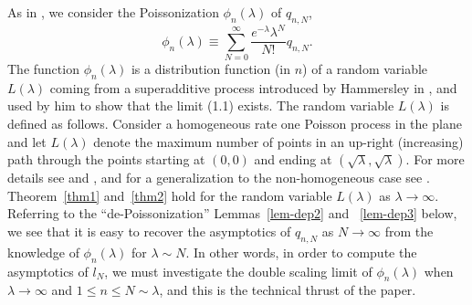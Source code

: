 \documentclass{amsart}
\theoremstyle{definition}
\theoremstyle{remark}
\numberwithin{equation}{section}
\begin{document}
\bigskip
As in \cite{Johan}, we consider the Poissonization $\phi_n(\lambda)$ 
of $q_{n,N}$, 
\begin{equation}\label{e-int4}
  \phi_n(\lambda) \equiv \sum_{N=0}^{\infty} 
\frac{e^{-\lambda}\lambda^N}{N!} q_{n,N}.
\end{equation}
The function $\phi_n(\lambda)$ is a distribution function (in $n$) of
a random variable $L(\lambda)$ coming from a superadditive process
introduced by Hammersley in \cite{Ha}, and used by him to show that the
limit (1.1) exists. The random variable $L(\lambda)$ is defined as
follows.
Consider a homogeneous rate one Poisson process in
the plane and let $L(\lambda)$ denote the maximum number of points in
an up-right (increasing) path through the points starting at $(0,0)$
and ending at $(\sqrt{\lambda},\sqrt{\lambda})$. For more details see
\cite{AD} and \cite{Se2}, and for a generalization to the non-homogeneous case
see \cite{DeZe}. Theorem~\ref{thm1}  and~\ref{thm2} 
hold for the random variable
$L(\lambda)$ as $\lambda\to\infty$.
Referring to the ``de-Poissonization'' 
Lemmas~\ref{lem-dep2} and ~\ref{lem-dep3} 
below, we see that it is easy to recover the asymptotics of $q_{n,N}$ 
as $N\to\infty$ from the knowledge of $\phi_n(\lambda)$ for 
$\lambda\sim N$. 
In other words, in order to compute the asymptotics of $l_N$, 
we must investigate 
the double scaling limit of $\phi_n(\lambda)$ when 
$\lambda\to\infty$ and $1\le n\le N\sim\lambda$, and this is 
the technical thrust of the paper.
\end{document}

